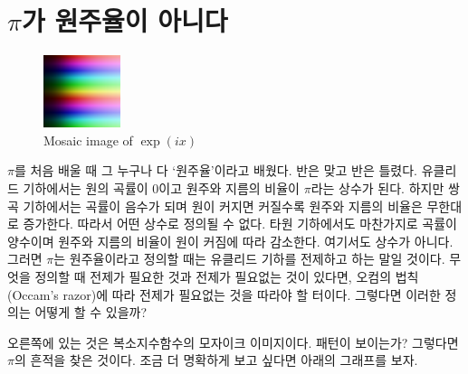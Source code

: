 \documentclass[10pt]{article}
\begin{document}
\section{$\pi$가 원주율이 아니다}
\begin{figure}
  \centering
  \includegraphics[width = 0.2\textwidth]{exp_mosaic.png}
  \caption{Mosaic image of $\exp\left(ix\right)$}
\end{figure}\par
$\pi$를 처음 배울 때 그 누구나 다 `원주율'이라고 배웠다. 반은 맞고 반은 틀렸다. 유클리드 기하에서는 원의 곡률이 0이고 원주와 지름의 비율이 $\pi$라는 상수가 된다. 하지만 쌍곡 기하에서는 곡률이 음수가 되며 원이 커지면 커질수록 원주와 지름의 비율은 무한대로 증가한다. 따라서 어떤 상수로 정의될 수 없다. 타원 기하에서도 마찬가지로 곡률이 양수이며 원주와 지름의 비율이 원이 커짐에 따라 감소한다. 여기서도 상수가 아니다. 그러면 $\pi$는 원주율이라고 정의할 때는 유클리드 기하를 전제하고 하는 말일 것이다. 무엇을 정의할 때 전제가 필요한 것과 전제가 필요없는 것이 있다면, 오컴의 법칙(Occam's razor)에 따라 전제가 필요없는 것을 따라야 할 터이다. 그렇다면 이러한 정의는 어떻게 할 수 있을까?\par
오른쪽에 있는 것은 복소지수함수의 모자이크 이미지이다. 패턴이 보이는가? 그렇다면 $\pi$의 흔적을 찾은 것이다. 조금 더 명확하게 보고 싶다면 아래의 그래프를 보자. 
\end{document}
